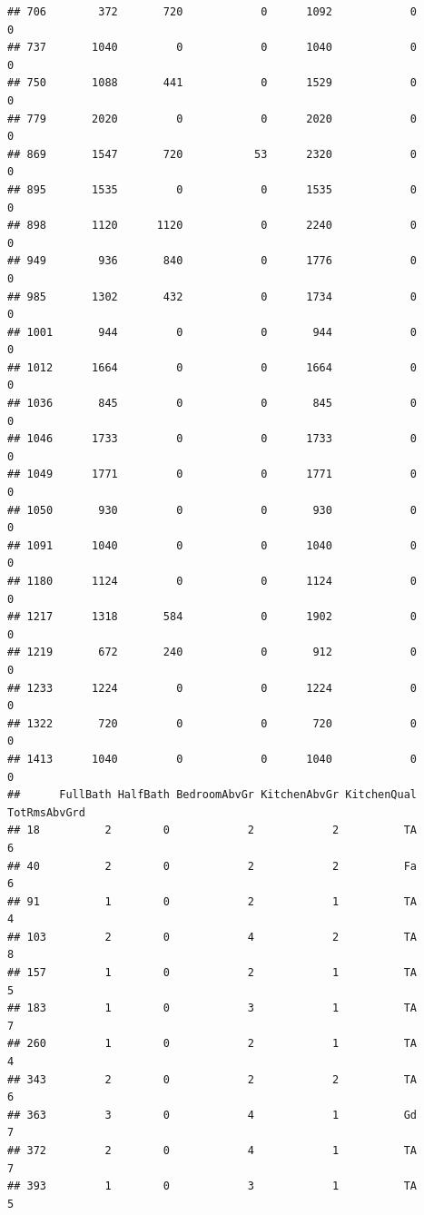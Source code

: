 \documentclass[]{article}
\begin{document}
\begin{verbatim}
## 706        372       720            0      1092            0            0
## 737       1040         0            0      1040            0            0
## 750       1088       441            0      1529            0            0
## 779       2020         0            0      2020            0            0
## 869       1547       720           53      2320            0            0
## 895       1535         0            0      1535            0            0
## 898       1120      1120            0      2240            0            0
## 949        936       840            0      1776            0            0
## 985       1302       432            0      1734            0            0
## 1001       944         0            0       944            0            0
## 1012      1664         0            0      1664            0            0
## 1036       845         0            0       845            0            0
## 1046      1733         0            0      1733            0            0
## 1049      1771         0            0      1771            0            0
## 1050       930         0            0       930            0            0
## 1091      1040         0            0      1040            0            0
## 1180      1124         0            0      1124            0            0
## 1217      1318       584            0      1902            0            0
## 1219       672       240            0       912            0            0
## 1233      1224         0            0      1224            0            0
## 1322       720         0            0       720            0            0
## 1413      1040         0            0      1040            0            0
##      FullBath HalfBath BedroomAbvGr KitchenAbvGr KitchenQual TotRmsAbvGrd
## 18          2        0            2            2          TA            6
## 40          2        0            2            2          Fa            6
## 91          1        0            2            1          TA            4
## 103         2        0            4            2          TA            8
## 157         1        0            2            1          TA            5
## 183         1        0            3            1          TA            7
## 260         1        0            2            1          TA            4
## 343         2        0            2            2          TA            6
## 363         3        0            4            1          Gd            7
## 372         2        0            4            1          TA            7
## 393         1        0            3            1          TA            5

\end{verbatim}
\end{document}

